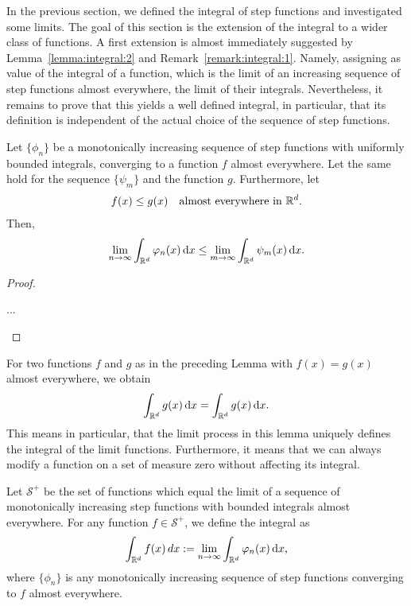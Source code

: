 \begin{intro}
  In the previous section, we defined the integral of step functions
  and investigated some limits. The goal of this section is the
  extension of the integral to a wider class of functions. A first
  extension is almost immediately suggested by
  Lemma~\ref{lemma:integral:2} and
  Remark~\ref{remark:integral:1}. Namely, assigning as value of the
  integral of a function, which is the limit of an increasing sequence
  of step functions almost everywhere, the limit of their
  integrals. Nevertheless, it remains to prove that this yields a well
  defined integral, in particular, that its definition is independent
  of the actual choice of the sequence of step functions.
\end{intro}

\begin{lemma}
  Let $\{\phi_n\}$ be a monotonically increasing sequence of step
  functions with uniformly bounded integrals, converging to a function
  $f$ almost everywhere. Let the same hold for the sequence
  $\{\psi_m\}$ and the function $g$. Furthermore, let
  \begin{gather*}
    f(x) \le g(x) \quad\text{almost everywhere in $\mathbb R^d$.}
  \end{gather*}
  Then,
  \begin{gather}
    \label{eq:integral:1}
    \lim_{n\to\infty} \int_{\mathbb R^d}\varphi_n(x)\,\mathrm{d} x
    \le
    \lim_{m\to\infty} \int_{\mathbb R^d}\psi_m(x)\,\mathrm{d} x.
  \end{gather}
\end{lemma}

\begin{proof}
  \begin{todo}
    ...
  \end{todo}
\end{proof}

\begin{corollary}
  For two functions $f$ and $g$ as in the preceding Lemma with $f(x) =
  g(x)$ almost everywhere, we obtain
  \begin{gather*}
    \int_{\mathbb R^d}g(x)\,\mathrm{d} x = \int_{\mathbb R^d}g(x)\,\mathrm{d} x.
  \end{gather*}
  This means in particular, that the limit process in this lemma
  uniquely defines the integral of the limit functions. Furthermore,
  it means that we can always modify a function on a set of measure
  zero without affecting its integral.
\end{corollary}

\begin{definition}
  Let $\mathcal S^+$ be the set of functions which equal the limit of
  a sequence of monotonically increasing step functions with bounded
  integrals almost everywhere. For any function $f\in \mathcal S^+$, we
  define the integral as
  \begin{gather*}
    \int_{\mathbb R^d} f(x) \,dx := \lim_{n\to\infty} \int_{\mathbb R^d}\varphi_n(x)\,\mathrm{d} x,
  \end{gather*}
  where $\{\phi_n\}$ is any monotonically increasing sequence of step
  functions converging to $f$ almost everywhere.
\end{definition}

